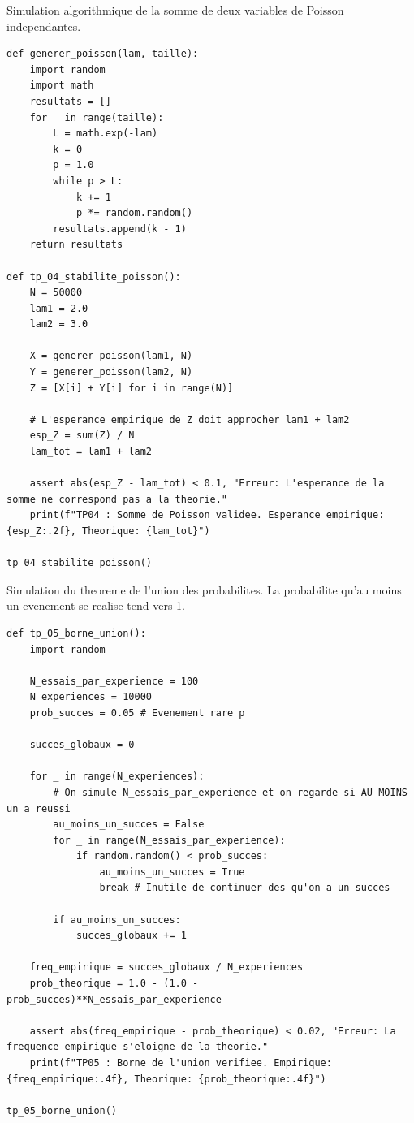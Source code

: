 \documentclass[11pt,a4paper]{article}
\begin{document}
Simulation algorithmique de la somme de deux variables de Poisson independantes.
\begin{lstlisting}
def generer_poisson(lam, taille):
    import random
    import math
    resultats = []
    for _ in range(taille):
        L = math.exp(-lam)
        k = 0
        p = 1.0
        while p > L:
            k += 1
            p *= random.random()
        resultats.append(k - 1)
    return resultats

def tp_04_stabilite_poisson():
    N = 50000
    lam1 = 2.0
    lam2 = 3.0

    X = generer_poisson(lam1, N)
    Y = generer_poisson(lam2, N)
    Z = [X[i] + Y[i] for i in range(N)]

    # L'esperance empirique de Z doit approcher lam1 + lam2
    esp_Z = sum(Z) / N
    lam_tot = lam1 + lam2

    assert abs(esp_Z - lam_tot) < 0.1, "Erreur: L'esperance de la somme ne correspond pas a la theorie."
    print(f"TP04 : Somme de Poisson validee. Esperance empirique: {esp_Z:.2f}, Theorique: {lam_tot}")

tp_04_stabilite_poisson()
\end{lstlisting}


Simulation du theoreme de l'union des probabilites. La probabilite qu'au moins un evenement se realise tend vers 1.
\begin{lstlisting}
def tp_05_borne_union():
    import random

    N_essais_par_experience = 100
    N_experiences = 10000
    prob_succes = 0.05 # Evenement rare p

    succes_globaux = 0

    for _ in range(N_experiences):
        # On simule N_essais_par_experience et on regarde si AU MOINS un a reussi
        au_moins_un_succes = False
        for _ in range(N_essais_par_experience):
            if random.random() < prob_succes:
                au_moins_un_succes = True
                break # Inutile de continuer des qu'on a un succes

        if au_moins_un_succes:
            succes_globaux += 1

    freq_empirique = succes_globaux / N_experiences
    prob_theorique = 1.0 - (1.0 - prob_succes)**N_essais_par_experience

    assert abs(freq_empirique - prob_theorique) < 0.02, "Erreur: La frequence empirique s'eloigne de la theorie."
    print(f"TP05 : Borne de l'union verifiee. Empirique: {freq_empirique:.4f}, Theorique: {prob_theorique:.4f}")

tp_05_borne_union()
\end{lstlisting}
\end{document}
